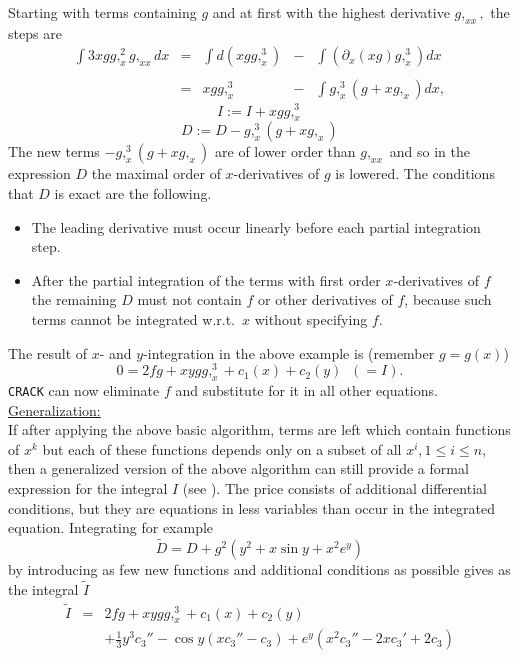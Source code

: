 Starting with terms containing $g$
and at first with the highest derivative $g,_{xx},$ the steps are
\[
\begin{array}{rcccl}
\int 3xgg,_x^2g,_{xx} dx 
& = & \int d(xgg,_x^3)
    & - & \int \left( \partial_x(xg) g,_x^3\right) dx \\ \\
& = & xgg,_x^3 & - & \int g,_x^3(g + xg,_x) dx,
\end{array} \]
\[ I := I + xgg,_x^3 \]
\[ D := D - g,_x^3(g + xg,_x)  \]
The new terms $- g,_x^3(g + xg,_x)$ are of lower order than $g,_{xx}$ 
and so in the expression $D$ the maximal order of $x$-derivatives 
of $g$ is lowered. The conditions that $D$ is exact are the following.
\begin{itemize}
\item The leading derivative must occur linearly before each partial
integration step. 
\item After the partial integration of the terms with first order
$x$-derivatives of $f$ the remaining $D$ must not contain $f$ 
or other derivatives of $f$, because such terms cannot
be integrated w.r.t.\ $x$ without specifying $f$.
\end{itemize}
The result of $x$- and $y$-integration in the above example is
(remember $g=g(x)$)
\begin{equation}
0 = 2fg + xygg,_x^3 + c_1(x) + c_2(y) \; \; (=I). \nonumber
\end{equation}
{\tt CRACK} can now eliminate $f$ and substitute
for it in all other equations.
\underline{Generalization:} \\
If after applying the above basic algorithm, terms are left which contain
functions of $x^k$ but each of these functions depends only on a subset of
all $x^i, 1\leq i\leq n,$ then a generalized version of the above algorithm
can still provide a formal expression for the integral $I$
(see \cite{WoInt}). The price consists of
additional differential conditions, but they are equations in less variables
than occur in the integrated equation. Integrating for example 
\begin{equation}
\tilde{D} = D + g^2(y^2 + x\sin y + x^2e^y)       \label{Dnew}
\end{equation}
by introducing as few 
new functions and additional conditions as possible gives as the integral 
$\tilde{I}$
\begin{eqnarray*}
\tilde{I} & = & 2fg + xygg,_{x}^{3} + c_1(x) + c_2(y) \\
  &   & + \frac{1}{3}y^3c_3'' - \cos y(xc_3'' - c_3)
+ e^y(x^2c_3'' - 2xc_3' + 2c_3)          
\end{eqnarray*}
